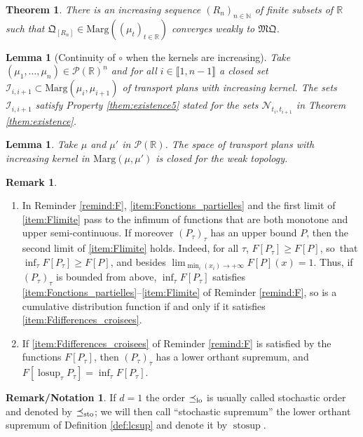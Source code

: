 \documentclass[10pt,a4paper]{article}
\theoremstyle{plain}
\newtheorem{themBJ}{Theorem}
\newtheorem{lem}[them]{Lemma}
\theoremstyle{definition}
\newtheorem{remnotation}[them]{Remark/Notation} %
\newtheorem{rem}[them]{Remark}
\newcommand{\como}{\mathfrak{Q}}
\newcommand{\mq}{\mathfrak{MQ}}
\newcommand{\p}{\mathcal{P}}
\newcommand{\ma}{\mathrm{Marg}}
\newcommand{\R}{\mathbb{R}}
\newcommand{\N}{\mathbb{N}}
\newcommand{\stosup}{\operatorname{stosup}}
\newcommand{\lcsup}{\operatorname{losup}}
\newcommand{\leqs}{\preceq_{\text{\rm sto}}}
\newcommand{\leqlc}{\preceq_{\rm lo}}
\begin{document}
\begin{themBJ}\label{them:b}There is an increasing sequence $(R_n)_{n\in\N}$ of finite subsets of $\R$ such that $\como_{[R_n]}\in\ma((\mu_t)_{t\in\R})$ converges weakly to $\mq$.
\end{themBJ}

\begin{lem}[Continuity of $\circ$ when the kernels are increasing]\label{lem:closed}Take $
(\mu_1,\ldots,\mu_n)\in\p(\R)^n$ and for all $i\in\llbracket1,n-1\rrbracket$ a closed set $\mathcal{I}_{i,i+1}\subset\ma(\mu_i,\mu_{i+1})$ of transport plans with increasing kernel. The sets $\mathcal{I}_{i,i+1}$ satisfy Property \eqref{them:existence5} stated for the sets $\mathcal{N}_{t_i,t_{i+1}}$ in Theorem \ref{them:existence}.
\end{lem}

\begin{lem}\label{lem:transitions_croissantes_limite} Take $\mu$ and $\mu'$ in $\p(\R)$. The space of transport plans with increasing kernel in $\ma(\mu,\mu')$ is closed for the weak topology.
\end{lem}

\begin{rem}\label{rem:lcsup}
\begin{enumerate}
\item
\label{p:lcsupa} In Reminder \ref{remind:F}, \eqref{item:Fonctions_partielles} and the first limit of \eqref{item:Flimite} pass to the infimum of functions that are both monotone and upper semi-continuous. If moreover $(P_\tau)_\tau$ has an upper bound $P$, then the second limit of \eqref{item:Flimite} holds. Indeed, for all $\tau$, $F[P_\tau]\geqslant F[P]$, so~that $\inf_\tau F[P_\tau]\geqslant F[P]$, and besides $\lim_{\min_i(x_i)\to+\infty}F[P](x)=1$. Thus, if $(P_\tau)_\tau$ is bounded from above, $\inf_\tau F[P_\tau]$ satisfies \eqref{item:Fonctions_partielles}--\eqref{item:Flimite} of Reminder \ref{remind:F}, so is a cumulative distribution function if and only if it satisfies \eqref{item:Fdifferences_croisees}.
\item
\label{p:lcsupb} If \eqref{item:Fdifferences_croisees} of Reminder \ref{remind:F} is satisfied by the functions $F[P_\tau]$, then $(P_\tau)_\tau$ has a lower orthant supremum, and $F[\lcsup_\tau P_\tau]=\inf_\tau F[P_\tau]$.
\end{enumerate}
\end{rem}

\begin{remnotation}\label{nota:stosup} If $d=1$ the order $\leqlc$ is usually called stochastic order and denoted by $\leqs$; we will then call ``stochastic supremum'' the lower orthant supremum of Definition \ref{def:lcsup} and denote it by $\stosup$.
\end{remnotation}
\end{document}
